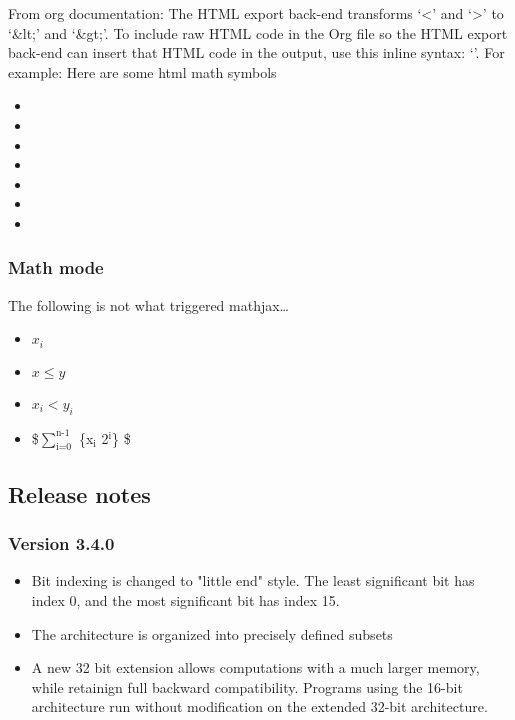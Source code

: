 \documentclass[11pt]{article}
\begin{document}
From org documentation: The HTML export back-end transforms ‘<’ and
‘>’ to ‘\&lt;’ and ‘\&gt;’. To include raw HTML code in the Org file so
the HTML export back-end can insert that HTML code in the output, use
this inline syntax: ‘’. For example: Here are some html
math symbols

\begin{itemize}
\item 
\item 
\item 
\item 
\item 
\item 
\item 
\end{itemize}

\subsubsection*{Math mode}
\label{sec:org5aec8c2}

The following is not what triggered mathjax\ldots{}

\begin{itemize}
\item \(x_i\)
\item \(x \leq y\)
\item \(x_i < y_i\)
\item \$\(\sum_{\text{i=0}}^{\text{n-1}}\) \{x\(_{\text{i}}\) \texttimes{} 2\(^{\text{i}}\)\} \$
\end{itemize}

\subsection*{Release notes}
\label{sec:org3fb8901}
\subsubsection*{Version 3.4.0}
\label{sec:org4ba1808}
\begin{itemize}
\item Bit indexing is changed to "little end" style.  The least
significant bit has index 0, and the most significant bit has
index 15.
\item The architecture is organized into precisely defined subsets
\item A new 32 bit extension allows computations with a much larger
memory, while retainign full backward compatibility.  Programs using
the 16-bit architecture run without modification on the extended
32-bit architecture.
\end{itemize}
\end{document}
